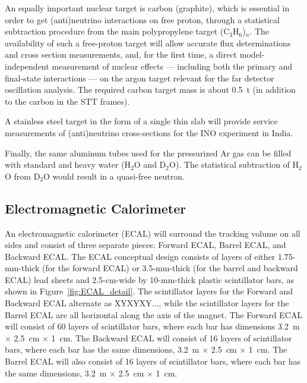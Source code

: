 An equally important nuclear target is carbon (graphite), which is essential in order to
get (anti)neutrino interactions on free proton, through a statistical
subtraction procedure from the main polypropylene target (C$_3$H$_6$)$_n$. 
The availability of such a free-proton target will allow 
accurate flux determinations and cross section measurements, and, for the first time, 
a direct model-independent measurement of nuclear effects --- including
both the primary and final-state interactions --- on the argon target
relevant for the far detector oscillation analysis. The required carbon target mass 
is about 0.5~t (in addition to the carbon in the STT frames).  

A stainless steel target in the form of a single thin slab will provide 
service measurements of (anti)neutrino cross-sections for the INO experiment in India. 

Finally, the same aluminum tubes used for the pressurized Ar gas can be filled with 
standard and heavy water (H$_2$O and D$_2$O). The statistical subtraction of H$_2$O from 
D$_2$O would result in a quasi-free neutron. 



\subsection{Electromagnetic Calorimeter}
\label{cdrsec:detectors-nd-ref-fgt-ecal}

An electromagnetic calorimeter 
(ECAL) will surround the tracking volume on all sides and consist of three separate pieces: Forward ECAL, Barrel ECAL, and Backward ECAL.  
The ECAL conceptual design consists of 
layers of either 1.75-mm-thick (for the forward ECAL) or 3.5-mm-thick 
(for the barrel and backward ECAL) lead sheets and 2.5-cm-wide by 10-mm-thick 
plastic scintillator bars,
as shown in Figure~\ref{fig:ECAL_detail}. 
The scintillator layers for the
Forward and Backward ECAL alternate as XYXYXY..., while the scintillator 
layers for the Barrel ECAL are all horizontal along the axis of the magnet.
The Forward ECAL will consist of 60 layers of scintillator bars, where each
bar has dimensions 3.2~m $\times$ 2.5~cm $\times$ 1~cm. The
Backward ECAL will consist of 16 layers of scintillator bars, where each 
bar has the same dimensions, 3.2~m $\times$ 2.5~cm $\times$ 1~cm. The Barrel ECAL will also consist 
of 16 layers of scintillator bars, where each bar has the same dimensions, 
3.2~m $\times$ 2.5~cm $\times$ 1~cm. 

